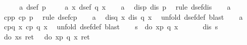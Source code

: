 \begin{isabellebody}
\isamarkupfalse%
\ {\isacharminus}\isanewline
\ \ \isamarkupfalse%
\ a{}{\isacharcolon}\ {\isachardoublequote}dsef\ p{\isachardoublequote}\ \isanewline
\ \ \isamarkupfalse%
\ a{}{\isacharcolon}\ {\isachardoublequote}{\isasymforall}x{\isachardot}\ dsef\ {\isacharparenleft}q\ x{\isacharparenright}{\isachardoublequote}\isanewline
\ \ \isamarkupfalse%
\ a{}\ \isamarkupfalse%
\ disp{\isacharcolon}\ {\isachardoublequote}dis\ p{\isachardoublequote}\ \isamarkupfalse%
\ {\isacharparenleft}rule\ dsef{\isacharunderscore}dis{\isacharparenright}\isanewline
\ \ \isamarkupfalse%
\ a{}\ \isamarkupfalse%
\ cpp{\isacharcolon}\ {\isachardoublequote}cp\ p{\isachardoublequote}\ \isamarkupfalse%
\ {\isacharparenleft}rule\ dsef{\isacharunderscore}cp{\isacharparenright}\isanewline
\ \ \isamarkupfalse%
\ a{}\ \isamarkupfalse%
\ disq{\isacharcolon}\ {\isachardoublequote}{\isasymforall}x{\isachardot}\ dis\ {\isacharparenleft}q\ x{\isacharparenright}{\isachardoublequote}\ \isamarkupfalse%
\ {\isacharparenleft}unfold\ dsef{\isacharunderscore}def{\isacharcomma}\ blast{\isacharparenright}\isanewline
\ \ \isamarkupfalse%
\ a{}\ \isamarkupfalse%
\ cpq{\isacharcolon}\ {\isachardoublequote}{\isasymforall}x{\isachardot}\ cp\ {\isacharparenleft}q\ x{\isacharparenright}{\isachardoublequote}\ \isamarkupfalse%
\ {\isacharparenleft}unfold\ dsef{\isacharunderscore}def{\isacharcomma}\ blast{\isacharparenright}\isanewline
\ \ \isamarkupfalse%
\ {\isacharquery}s\ {\isacharequal}\ {\isachardoublequote}do\ {\isacharbraceleft}x{\isasymleftarrow}p{\isacharsemicolon}\ q\ x{\isacharbraceright}{\isachardoublequote}\isanewline
\ \ %
\isanewline
\ \ \isamarkupfalse%
\ {\isachardoublequote}dis\ {\isacharquery}s{\isachardoublequote}\isanewline
\ \ \isamarkupfalse%
\ {\isacharminus}\isanewline
\ \ \ \ \isamarkupfalse%
\ {\isachardoublequote}do\ {\isacharbraceleft}x{\isasymleftarrow}{\isacharquery}s{\isacharsemicolon}\ ret\ {\isacharparenleft}{\isacharparenright}{\isacharbraceright}\ {\isacharequal}\ do\ {\isacharbraceleft}x{\isasymleftarrow}p{\isacharsemicolon}\ q\ x{\isacharsemicolon}\ ret\ {\isacharparenleft}{\isacharparenright}{\isacharbraceright}{\isachardoublequote}\ \isamarkupfalse%

\end{isabellebody}
